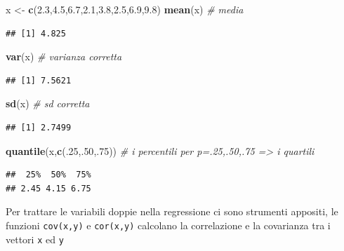 \documentclass[
  11pt,
]{book}
\newenvironment{Shaded}{\begin{snugshade}}{\end{snugshade}}
\newcommand{\CommentTok}[1]{\textcolor[rgb]{0.56,0.35,0.01}{\textit{#1}}}
\newcommand{\DecValTok}[1]{\textcolor[rgb]{0.00,0.00,0.81}{#1}}
\newcommand{\FloatTok}[1]{\textcolor[rgb]{0.00,0.00,0.81}{#1}}
\newcommand{\FunctionTok}[1]{\textcolor[rgb]{0.13,0.29,0.53}{\textbf{#1}}}
\newcommand{\NormalTok}[1]{#1}
\newcommand{\OtherTok}[1]{\textcolor[rgb]{0.56,0.35,0.01}{#1}}
\theoremstyle{mytheoremstyle}
\theoremstyle{mydefstyle}
\begin{document}
\begin{Shaded}
\begin{Highlighting}[]
\NormalTok{x }\OtherTok{\textless{}{-}} \FunctionTok{c}\NormalTok{(}\FloatTok{2.3}\NormalTok{,}\FloatTok{4.5}\NormalTok{,}\FloatTok{6.7}\NormalTok{,}\FloatTok{2.1}\NormalTok{,}\FloatTok{3.8}\NormalTok{,}\FloatTok{2.5}\NormalTok{,}\FloatTok{6.9}\NormalTok{,}\FloatTok{9.8}\NormalTok{)}
\FunctionTok{mean}\NormalTok{(x)   }\CommentTok{\# media}
\end{Highlighting}
\end{Shaded}

\begin{verbatim}
## [1] 4.825
\end{verbatim}

\begin{Shaded}
\begin{Highlighting}[]
\FunctionTok{var}\NormalTok{(x)    }\CommentTok{\# varianza corretta}
\end{Highlighting}
\end{Shaded}

\begin{verbatim}
## [1] 7.5621
\end{verbatim}

\begin{Shaded}
\begin{Highlighting}[]
\FunctionTok{sd}\NormalTok{(x)     }\CommentTok{\# sd corretta}
\end{Highlighting}
\end{Shaded}

\begin{verbatim}
## [1] 2.7499
\end{verbatim}

\begin{Shaded}
\begin{Highlighting}[]
\FunctionTok{quantile}\NormalTok{(x,}\FunctionTok{c}\NormalTok{(.}\DecValTok{25}\NormalTok{,.}\DecValTok{50}\NormalTok{,.}\DecValTok{75}\NormalTok{)) }\CommentTok{\# i percentili per p=.25,.50,.75 =\textgreater{} i quartili}
\end{Highlighting}
\end{Shaded}

\begin{verbatim}
##  25%  50%  75% 
## 2.45 4.15 6.75
\end{verbatim}

Per trattare le variabili doppie nella regressione ci sono strumenti appositi,
le funzioni \texttt{cov(x,y)} e \texttt{cor(x,y)} calcolano la correlazione e la covarianza tra i vettori
\texttt{x} ed \texttt{y}
\end{document}

